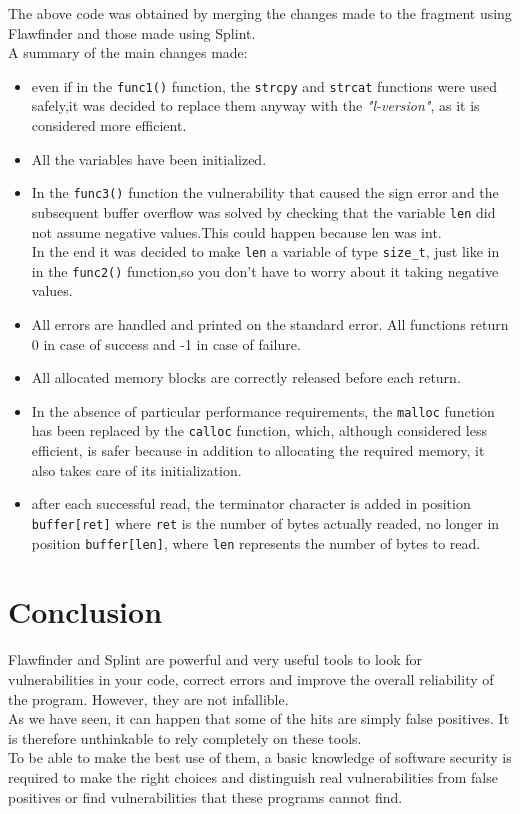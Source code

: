 \documentclass[a4paper,12pt]{article}
\begin{document}
The above code was obtained by merging the changes made to the fragment using Flawfinder and those made using Splint.\\
A summary of the main changes made:
\begin{itemize}
  \item even if in the \texttt{func1()} function, the \texttt{strcpy} and \texttt{strcat} functions were used safely,it was decided to replace them anyway with the \textit{"l-version"}, as it is considered more efficient.
  \item All the variables have been initialized.
  \item In the \texttt{func3()} function the vulnerability that caused the sign error and the subsequent buffer overflow was solved by checking that the variable \texttt{len} did not assume negative values.This could happen because len was int.\\
In the end it was decided to make \texttt{len} a variable of type \texttt{size\_t}, just like in in the \texttt{func2()} function,so you don't have to worry about it taking negative values.
\item All errors are handled and printed on the standard error.
All functions return 0 in case of success and -1 in case of failure.
\item All allocated memory blocks are correctly released before each return.
\item In the absence of particular performance requirements, the \texttt{malloc} function has been replaced by the \texttt{calloc} function, which, although considered less efficient, is safer because in addition to allocating the required memory, it also takes care of its initialization.
\item after each successful read, the terminator character is added in position \texttt{buffer[ret]} where \texttt{ret} is the number of bytes actually readed, no longer in position \texttt{buffer[len]}, where \texttt{len} represents the number of bytes to read.
\end{itemize}
\section{Conclusion}

Flawfinder and Splint are powerful and very useful tools to look for vulnerabilities in your code, correct errors and improve the overall reliability of the program.
However, they are not infallible.\\
As we have seen, it can happen that some of the hits are simply false positives. It is therefore unthinkable to rely completely on these tools.\\
To be able to make the best use of them, a basic knowledge of software security is required to make the right choices and distinguish real vulnerabilities from false positives or find vulnerabilities that these programs cannot find.
\end{document}
